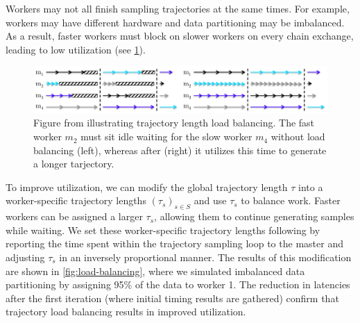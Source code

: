 \documentclass{article}
\begin{document}
Workers may not all finish sampling trajectories at the same times.
For example, workers may have different hardware and data partitioning may be imbalanced.
As a result, faster workers must block on slower workers on every chain exchange, leading to
low utilization (see \cref{fig:ahn-lb}).

\begin{figure}[htbp]
  \centering
  \includegraphics[width=1.0\linewidth]{poster-figures/ahn-lb.png}
  \caption{Figure from \cite{ahn2014distributed} illustrating trajectory length load balancing.
    The fast worker $m_2$ must sit idle waiting for the slow worker $m_4$ without load balancing (left),
    whereas after (right) it utilizes this time to generate a longer tarjectory.}
  \label{fig:ahn-lb}
\end{figure}

To improve utilization, we can modify the global trajectory length $\tau$ into
a worker-specific trajectory lengths $(\tau_s)_{s \in S}$ and use $\tau_s$ to
balance work. Faster workers can be assigned a larger $\tau_s$, allowing them
to continue generating samples while waiting. We set these worker-specific
trajectory lengths following \citet{ahn2014distributed} by reporting the time spent
within the trajectory sampling loop to the master and adjusting $\tau_s$ in an
inversely proportional manner. The results of this modification are shown in
\cref{fig:load-balancing}, where we simulated imbalanced data partitioning by
assigning 95\% of the data to worker 1. The reduction in latencies after the first
iteration (where initial timing results are gathered) confirm that trajectory load
balancing results in improved utilization.
\end{document}
